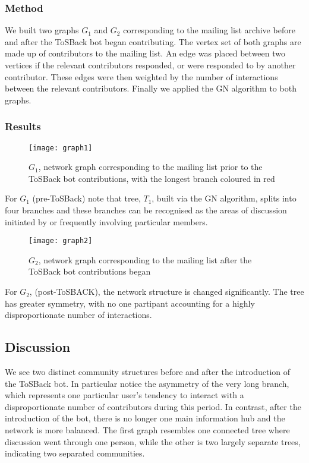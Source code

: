 \documentclass{sig-alternate}
\begin{document}
\subsubsection{Method}

We built two graphs $G_{1}$ and $G_2$ corresponding to the mailing list archive before and after the ToSBack bot began contributing. The vertex set of both graphs are made up of contributors to the mailing list. An edge was placed between two vertices if the relevant contributors responded, or were responded to by another contributor. These edges were then weighted by the number of interactions between the relevant contributors. Finally we applied the GN algorithm to both graphs.


\subsubsection{Results}
\begin{figure}[H]
\texttt{[image: graph1]}\caption[width=7]{ $G_1$, network graph corresponding to the mailing list prior to the ToSBack bot contributions, with the longest branch coloured in red}\label{fig:t1}
\end{figure}
For $G_1$ (pre-ToSBack) note that tree, $T_1$, built via the GN algorithm, splits into four branches and these branches can be recognised as the areas of discussion initiated by or frequently involving particular members.
\begin{figure}[H]
\texttt{[image: graph2]}\caption{ $G_2$, network graph corresponding to the mailing list after the ToSBack bot contributions began}\label{fig:t2}
\end{figure}
For $G_2$, (post-ToSBACK), the network structure is changed significantly. The tree has greater symmetry, with no one partipant accounting for a highly disproportionate number of interactions.

\subsection{Discussion}

We see two distinct community structures before and after the introduction of the ToSBack bot. In particular notice the asymmetry of the very long branch, which represents one particular user's tendency to interact with a disproportionate number of contributors during this period. In contrast, after the introduction of the bot, there is no longer one main information hub and the network is more balanced. The first graph resembles one connected tree where discussion went through one person, while the other is two largely separate trees, indicating two separated communities.
\end{document}
